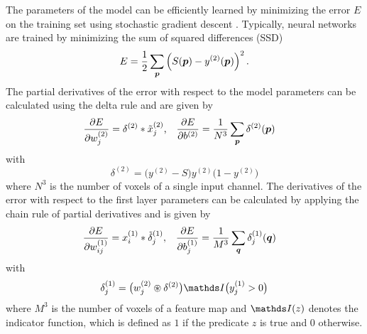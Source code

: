 The parameters of the model can be efficiently learned by minimizing the error
$E$ on the training set using stochastic gradient descent
\cite{LeCun1998}. Typically, neural networks are trained by minimizing the sum
of squared differences (SSD)
\begin{equation}
E = \frac{1}{2}\sum_{\vect{p}}\left(S(\vect{p}) -
y^{(2)}(\vect{p})\right)^2.
\end{equation}
The partial derivatives of the error with respect to the model parameters can be
calculated using the delta rule and are given by
\begin{align}
\frac{\partial E}{\partial w^{(2)}_j} &= \delta^{(2)} * \tilde{x}^{(2)}_j
\text{,} &
\frac{\partial E}{\partial b^{(2)}} &= \frac{1}{N^3}\sum_{\vect{p}}
\delta^{(2)}(\vect{p})
\label{eq:dE2}
\end{align}
with 
\begin{equation}
\delta^{(2)} = \big(y^{(2)} -S\big)y^{(2)}\big(1-y^{(2)}\big)
\label{eq:delta2}
\end{equation}
where $N^3$ is the number of voxels of a single input channel. The derivatives
of the error with respect to the first layer parameters can be calculated by
applying the chain rule of partial derivatives and is given by
\begin{align}
\frac{\partial E}{\partial w^{(1)}_{ij}} &= x^{(1)}_i * \tilde{\delta}^{(1)}_j,
&
\frac{\partial E}{\partial b^{(1)}_j} &= \frac{1}{M^3}\sum_{\vect{q}}
\delta^{(1)}_j(\vect{q})
\label{eq:dE1}
\end{align}
with
\begin{equation}
\delta^{(1)}_j = \big(w^{(2)}_{j}\circledast\delta^{(2)}\big)\I\big(y^{(1)}_j >
0\big)
\label{eq:delta1}
\end{equation}
where $M^3$ is the number of voxels of a feature map and $\I(z)$ denotes the
indicator function, which is defined as $1$ if the predicate $z$ is true and
$0$ otherwise.

